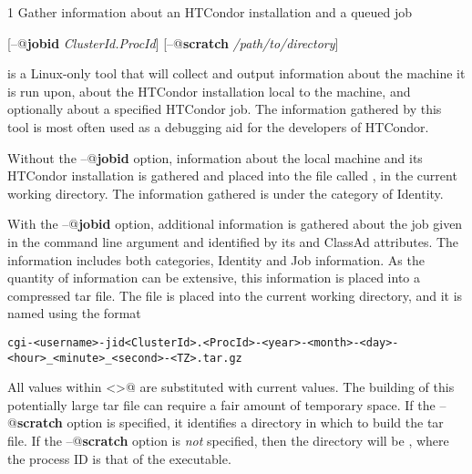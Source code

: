 \begin{ManPage}{\label{man-condor-gather-info}}{1}
{Gather information about an HTCondor installation and a queued job}

\Synopsis

[\verb@--@\textbf{jobid} \textit{ClusterId.ProcId}]
[\verb@--@\textbf{scratch} \textit{/path/to/directory}]

\Description

 is a Linux-only tool that
will collect and output information 
about the machine it is run upon,
about the HTCondor installation local to the machine, 
and optionally about a specified HTCondor job. 
The information gathered by this tool is most often used as a debugging aid
for the developers of HTCondor.

Without the \verb@--@\textbf{jobid} option, information about the
local machine and its HTCondor installation is gathered and
placed into the file called ,
in the current working directory. 
The information gathered is under the category of Identity.

With the \verb@--@\textbf{jobid} option, 
additional information is gathered about the job given
in the command line argument and identified by
its  and  ClassAd attributes.
The information includes both categories, 
Identity and Job information.
As the quantity of information can be extensive,
this information is placed into a compressed tar file.
The file is placed into the current working directory,
and it is named using the format
\footnotesize
\begin{verbatim}
cgi-<username>-jid<ClusterId>.<ProcId>-<year>-<month>-<day>-<hour>_<minute>_<second>-<TZ>.tar.gz
\end{verbatim}
\normalsize
All values within \verb@<>@ are substituted with current values.
The building of this potentially large tar file can require a fair
amount of temporary space.
If the \verb@--@\textbf{scratch} option is specified,
it identifies a directory in which to build the tar file.
If the \verb@--@\textbf{scratch} option is \emph{not} specified, 
then the directory will be ,
where the process ID is that of the  executable.


\end{ManPage}
